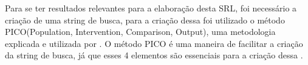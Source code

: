 \documentclass[12pt]{article}
\begin{document}
Para se ter resultados relevantes para a elaboração desta SRL, foi necessário a criação de uma string de busca, para a criação dessa foi utilizado o método PICO(Population, Intervention, Comparison, Output), uma metodologia explicada e utilizada por \cite{SANTOS2007}. O método PICO é uma maneira de facilitar a criação da string de busca, já que esses 4 elementos são essenciais para a criação dessa \cite{SANTOS2007}.






\end{document}

